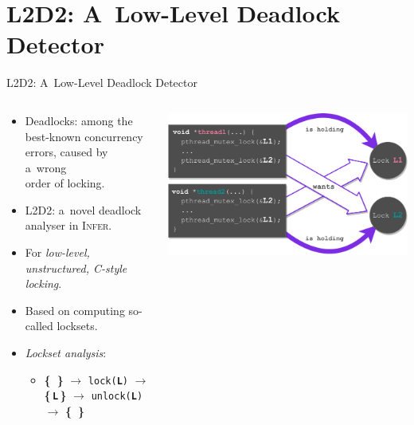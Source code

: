 \documentclass[10pt, xcolor=pdflatex, hyperref={unicode}, aspectratio=169]{beamer}
\begin{document}
\section{L2D2: A~Low-Level Deadlock Detector}
\begin{frame}{\textsc{L2D2}: A~Low-Level Deadlock Detector}
    \begin{columns}
        \begin{column}{.6 \linewidth}
            \begin{itemize}\setlength\itemsep{1em}
                \item \alert{Deadlocks}: among the best-known concurrency errors, caused by a~wrong \\ order of locking.

                \item \textsc{\alert{L2D2}}: a~novel deadlock analyser in \textsc{Infer}.

                \item For \emph{low-level, unstructured, C-style locking}.

                \item Based on computing so-called \alert{locksets}.

                \item \emph{Lockset analysis}:
                    \vspace{.5em}
                    \begin{itemize}
                        \item[] \alert{\textbf{\{\ \}}} $ \rightarrow $ \texttt{lock(\alert{\textbf{L}})} $ \rightarrow $ \alert{\textbf{\{\,\texttt{L}\,\}}} $ \rightarrow $ \texttt{unlock(\alert{\textbf{L}})} $ \rightarrow $ \alert{\textbf{\{\ \}}}
                    \end{itemize}
            \end{itemize}
        \end{column}

        \begin{column}{.4 \linewidth}
            \hspace*{-2.5em}
            \includegraphics[scale=.5]{deadlock.pdf}
        \end{column}
    \end{columns}
\end{frame}
\end{document}
